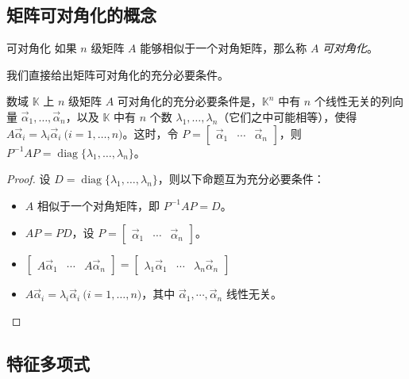 
\subsection{矩阵可对角化的概念}

\begin{definition}{可对角化}
	如果 $n$ 级矩阵 $A$ 能够相似于一个对角矩阵，那么称 $A$ \emph{可对角化}。
\end{definition}

我们直接给出矩阵可对角化的充分必要条件。

\begin{theorem}[矩阵可对角化的充分必要条件]
	数域 $\mathbb K$ 上 $n$ 级矩阵 $A$ 可对角化的充分必要条件是，$\mathbb K^n$ 中有 $n$ 个线性无关的列向量 $\vec \alpha_1, \ldots, \vec \alpha_n$，以及 $\mathbb K$ 中有 $n$ 个数 $\lambda_1, \ldots, \lambda_n$（它们之中可能相等），使得 $A \vec \alpha_i = \lambda_i \vec \alpha_i \pod{i = 1, \ldots, n}$。这时，令 $P = \begin{bmatrix} \vec \alpha_1 & \cdots & \vec \alpha_n \end{bmatrix}$，则 $P^{-1} AP = \operatorname{diag} \{ \lambda_1, \ldots, \lambda_n \}$。
\end{theorem}

\begin{proof}
	设 $D = \operatorname{diag} \{ \lambda_1, \ldots, \lambda_n \}$，则以下命题互为充分必要条件：

	\begin{itemize}
		\item $A$ 相似于一个对角矩阵，即 $P^{-1} AP = D$。
		\item $AP = PD$，设 $P = \begin{bmatrix} \vec \alpha_1 & \cdots & \vec \alpha_n \end{bmatrix}$。
		\item $\begin{bmatrix} A \vec \alpha_1 & \cdots & A \vec \alpha_n \end{bmatrix} =  \begin{bmatrix} \lambda_1 \vec \alpha_1 & \cdots & \lambda_n \vec \alpha_n \end{bmatrix}$
		\item $A \vec \alpha_i = \lambda_i \vec \alpha_i \pod{i = 1, \ldots, n}$，其中 $\vec \alpha_1, \cdots, \vec \alpha_n$ 线性无关。
	\end{itemize}
\end{proof}

\subsection{特征多项式}

